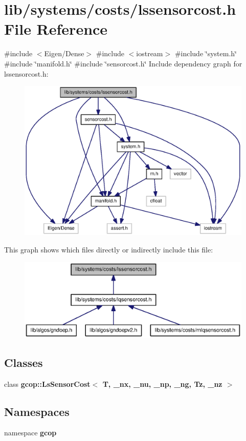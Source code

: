 \section{lib/systems/costs/lssensorcost.h \-File \-Reference}
\label{lssensorcost_8h}
{\ttfamily \#include $<$\-Eigen/\-Dense$>$}\*
{\ttfamily \#include $<$iostream$>$}\*
{\ttfamily \#include \char`\"{}system.\-h\char`\"{}}\*
{\ttfamily \#include \char`\"{}manifold.\-h\char`\"{}}\*
{\ttfamily \#include \char`\"{}sensorcost.\-h\char`\"{}}\*
\-Include dependency graph for lssensorcost.\-h\-:
\nopagebreak
\begin{figure}[H]
\begin{center}
\leavevmode
\includegraphics[width=350pt]{lssensorcost_8h__incl}
\end{center}
\end{figure}
\-This graph shows which files directly or indirectly include this file\-:
\nopagebreak
\begin{figure}[H]
\begin{center}
\leavevmode
\includegraphics[width=350pt]{lssensorcost_8h__dep__incl}
\end{center}
\end{figure}
\subsection*{\-Classes}
\begin{DoxyCompactItemize}
\item 
class {\bf gcop\-::\-Ls\-Sensor\-Cost$<$ T, \-\_\-nx, \-\_\-nu, \-\_\-np, \-\_\-ng, Tz, \-\_\-nz $>$}
\end{DoxyCompactItemize}
\subsection*{\-Namespaces}
\begin{DoxyCompactItemize}
\item 
namespace {\bf gcop}
\end{DoxyCompactItemize}
